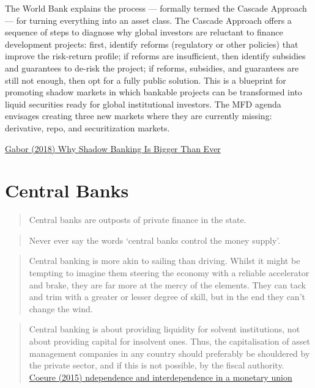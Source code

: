 \documentclass[
]{book}
\begin{document}
The World Bank explains the process --- formally termed the Cascade Approach --- for turning everything into an asset class. The Cascade Approach offers a sequence of steps to diagnose why global investors are reluctant to finance development projects: first, identify reforms (regulatory or other policies) that improve the risk-return profile; if reforms are insufficient, then identify subsidies and guarantees to de-risk the project; if reforms, subsidies, and guarantees are still not enough, then opt for a fully public solution. This is a blueprint for promoting shadow markets in which bankable projects can be transformed into liquid securities ready for global institutional investors.
The MFD agenda envisages creating three new markets where they are currently missing: derivative, repo, and securitization markets.

\href{https://jacobin.com/2018/11/why-shadow-banking-is-bigger-than-ever}{Gabor (2018) Why Shadow Banking Is Bigger Than Ever}

\hypertarget{central-banks-1}{%
\chapter{Central Banks}\label{central-banks-1}}

\begin{quote}
Central banks are outposts of private finance in the state.
\end{quote}

\begin{quote}
Never ever say the words `central banks control the money supply'.
\end{quote}

\begin{quote}
Central banking is more akin to sailing than driving. Whilst it might be tempting to imagine them steering the economy with a reliable accelerator and brake, they are far more at the mercy of the elements. They can tack and trim with a greater or lesser degree of skill, but in the end they can't change the wind.
\end{quote}

\begin{quote}
Central banking is about providing liquidity for solvent institutions, not about providing capital for insolvent ones. Thus, the capitalisation of asset management companies in any country should preferably be shouldered by the private sector, and if this is not possible, by the fiscal authority.
\href{https://www.ecb.europa.eu/press/key/date/2015/html/sp150202.en.html}{Coeure (2015) ndependence and interdependence in a monetary union}
\end{quote}
\end{document}
